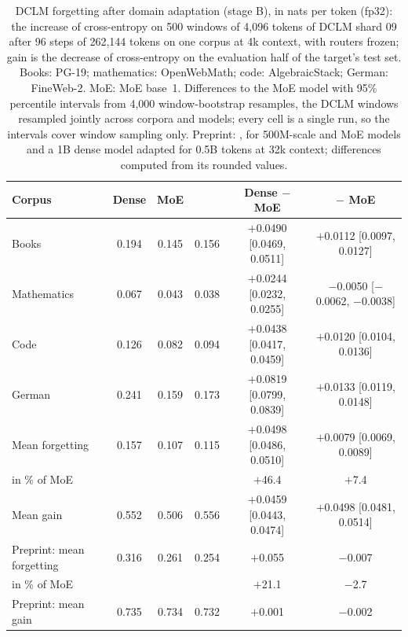 \begin{table}[t]
\centering
\caption{DCLM forgetting after domain adaptation (stage B), in nats per token (fp32): the increase of cross-entropy on 500 windows of 4,096 tokens of DCLM shard 09 after 96 steps of 262,144 tokens on one corpus at 4k context, with routers frozen; gain is the decrease of cross-entropy on the evaluation half of the target's test set. Books: PG-19; mathematics: OpenWebMath; code: AlgebraicStack; German: FineWeb-2. MoE: MoE base~1. Differences to the MoE model with 95\% percentile intervals from 4,000 window-bootstrap resamples, the DCLM windows resampled jointly across corpora and models; every cell is a single run, so the intervals cover window sampling only. Preprint: \citep[Table~6]{chu2026nested}, for 500M-scale \nestor{} and MoE models and a 1B dense model adapted for 0.5B tokens at 32k context; differences computed from its rounded values.}
\label{tab:stageB}
\footnotesize
\setlength{\tabcolsep}{4pt}
\begin{tabular}{@{}lccccc@{}}
\toprule
Corpus & Dense & MoE & \nestor{} & Dense $-$ MoE & \nestor{} $-$ MoE\\
\midrule
Books & 0.194 & 0.145 & 0.156 & $+$0.0490 [0.0469, 0.0511] & $+$0.0112 [0.0097, 0.0127]\\
Mathematics & 0.067 & 0.043 & 0.038 & $+$0.0244 [0.0232, 0.0255] & $-$0.0050 [$-$0.0062, $-$0.0038]\\
Code & 0.126 & 0.082 & 0.094 & $+$0.0438 [0.0417, 0.0459] & $+$0.0120 [0.0104, 0.0136]\\
German & 0.241 & 0.159 & 0.173 & $+$0.0819 [0.0799, 0.0839] & $+$0.0133 [0.0119, 0.0148]\\
\midrule
Mean forgetting & 0.157 & 0.107 & 0.115 & $+$0.0498 [0.0486, 0.0510] & $+$0.0079 [0.0069, 0.0089]\\
\quad in \% of MoE & & & & $+$46.4 & $+$7.4\\
Mean gain & 0.552 & 0.506 & 0.556 & $+$0.0459 [0.0443, 0.0474] & $+$0.0498 [0.0481, 0.0514]\\
\midrule
Preprint: mean forgetting & 0.316 & 0.261 & 0.254 & $+$0.055 & $-$0.007\\
\quad in \% of MoE & & & & $+$21.1 & $-$2.7\\
Preprint: mean gain & 0.735 & 0.734 & 0.732 & $+$0.001 & $-$0.002\\
\bottomrule
\end{tabular}
\end{table}
